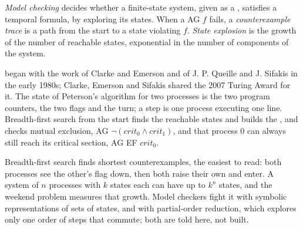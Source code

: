 \begin{definition}\label{def:b3:program-verification:mc}
\emph{Model checking} decides whether a finite-state system, given as a , satisfies a temporal formula, by exploring its states. When a  AG $f$ fails, a \emph{counterexample trace} is a path from the start to a state violating $f$. \emph{State explosion} is the growth of the number of reachable states, exponential in the number of components of the system.
\end{definition}

 began with the work of Clarke and Emerson and of J. P. Queille and J. Sifakis in the early 1980s; Clarke, Emerson and Sifakis shared the 2007 Turing Award for it. %
The state of Peterson's algorithm for two processes is the two program counters, the two flags and the turn; a step is one process executing one line. Breadth-first search from the start finds the reachable states and builds the , and  checks mutual exclusion, AG $\neg(\mathit{crit}_0 \wedge \mathit{crit}_1)$, and that process 0 can always still reach its critical section, AG EF $\mathit{crit}_0$.

\label{lst:b3:program-verification:peterson}

\label{out:b3:program-verification:peterson}

Breadth-first search finds shortest counterexamples, the easiest to read: both processes see the other's flag down, then both raise their own and enter. A system of $n$ processes with $k$ states each can have up to $k^n$ states, and the weekend problem measures that growth. Model checkers fight it with symbolic representations of sets of states, and with partial-order reduction, which explores only one order of steps that commute; both are told here, not built.

